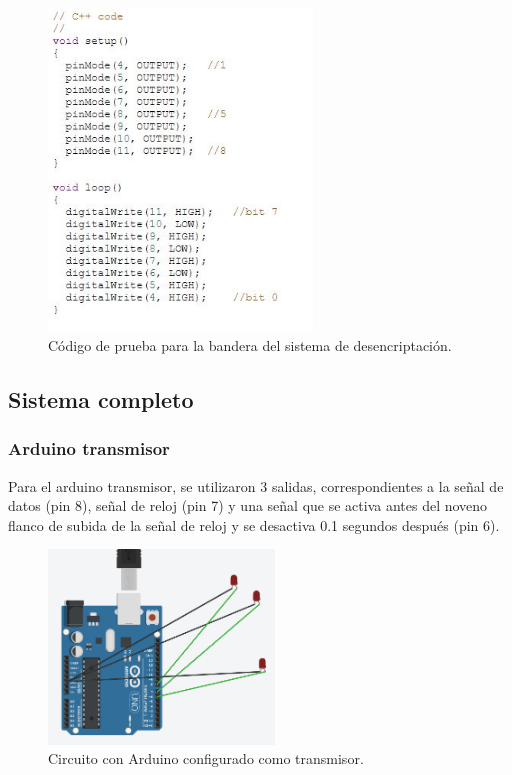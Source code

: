 \documentclass{article}
\begin{document}
\begin{figure}[h]
\includegraphics[width=7cm]{Desencrip1.JPG}
\centering
\caption{Código de prueba para la bandera del sistema de desencriptación.}
\label{fig:Desencrip1.PNG}
\end{figure}

\newpage



\subsection{Sistema completo}

\subsubsection{Arduino transmisor}

Para el arduino transmisor, se utilizaron 3 salidas, correspondientes a la señal de datos (pin 8), señal de reloj (pin 7) y una señal que se activa antes del noveno flanco de subida de la señal de reloj y se desactiva 0.1 segundos después (pin 6).\\


\begin{figure}[h]
\includegraphics[width=6cm]{arduino_transmisor.PNG}
\centering
\caption{Circuito con Arduino configurado como transmisor.}
\label{fig:arduino_transmisor.PNG}
\end{figure}
\end{document}

